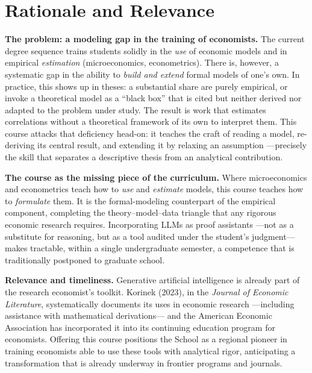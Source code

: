 \documentclass[11pt]{article}
\begin{document}
\section{Rationale and Relevance}

\textbf{The problem: a modeling gap in the training of economists.}
The current degree sequence trains students solidly in the \emph{use} of economic models and in empirical \emph{estimation} (microeconomics, econometrics). There is, however, a systematic gap in the ability to \emph{build and extend} formal models of one's own. In practice, this shows up in theses: a substantial share are purely empirical, or invoke a theoretical model as a ``black box'' that is cited but neither derived nor adapted to the problem under study. The result is work that estimates correlations without a theoretical framework of its own to interpret them. This course attacks that deficiency head-on: it teaches the craft of reading a model, re-deriving its central result, and extending it by relaxing an assumption ---precisely the skill that separates a descriptive thesis from an analytical contribution.

\textbf{The course as the missing piece of the curriculum.}
Where microeconomics and econometrics teach how to \emph{use} and \emph{estimate} models, this course teaches how to \emph{formulate} them. It is the formal-modeling counterpart of the empirical component, completing the theory--model--data triangle that any rigorous economic research requires. Incorporating LLMs as proof assistants ---not as a substitute for reasoning, but as a tool audited under the student's judgment--- makes tractable, within a single undergraduate semester, a competence that is traditionally postponed to graduate school.

\textbf{Relevance and timeliness.}
Generative artificial intelligence is already part of the research economist's toolkit. Korinek (2023), in the \emph{Journal of Economic Literature}, systematically documents its uses in economic research ---including assistance with mathematical derivations--- and the American Economic Association has incorporated it into its continuing education program for economists. Offering this course positions the School as a regional pioneer in training economists able to use these tools with analytical rigor, anticipating a transformation that is already underway in frontier programs and journals.
\end{document}
